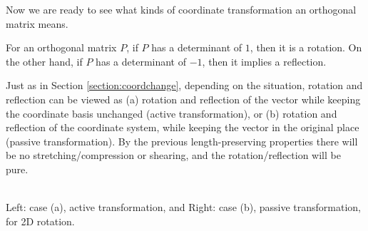 Now we are ready to see what kinds of coordinate transformation an orthogonal matrix means.
\begin{thm}
\label{thm:orthodet}
For an orthogonal matrix $P$, if $P$ has a determinant of $1$, then it is a rotation. On the other hand, if $P$ has a determinant of $-1$, then it implies a reflection.
\end{thm}
Just as in Section \ref{section:coordchange}, depending on the situation, rotation and reflection can be viewed as (a) rotation and reflection of the vector while keeping the coordinate basis unchanged (active transformation), or (b) rotation and reflection of the coordinate system, while keeping the vector in the original place (passive transformation). By the previous length-preserving properties there will be no stretching/compression or shearing, and the rotation/reflection will be pure.

\begin{center}
\\
Left: case (a), active transformation, and Right: case (b), passive transformation, for 2D rotation. 
\end{center}

